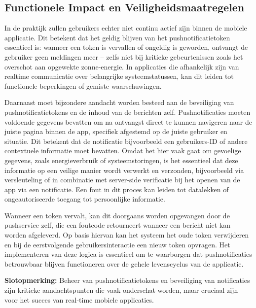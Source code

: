 \subsection{Functionele Impact en Veiligheidsmaatregelen}
In de praktijk zullen gebruikers echter niet continu actief zijn binnen de mobiele applicatie. Dit betekent dat het geldig blijven van het pushnotificatietoken essentieel is: wanneer een token is vervallen of ongeldig is geworden, ontvangt de gebruiker geen meldingen meer – zelfs niet bij kritieke gebeurtenissen zoals het overschot aan opgewekte zonne-energie. In applicaties die afhankelijk zijn van realtime communicatie over belangrijke systeemstatussen, kan dit leiden tot functionele beperkingen of gemiste waarschuwingen.

Daarnaast moet bijzondere aandacht worden besteed aan de beveiliging van pushnotificatietokens en de inhoud van de berichten zelf. Pushnotificaties moeten voldoende gegevens bevatten om na ontvangst direct te kunnen navigeren naar de juiste pagina binnen de app, specifiek afgestemd op de juiste gebruiker en situatie. Dit betekent dat de notificatie bijvoorbeeld een gebruikers-ID of andere contextuele informatie moet bevatten. Omdat het hier vaak gaat om gevoelige gegevens, zoals energieverbruik of systeemstoringen, is het essentieel dat deze informatie op een veilige manier wordt verwerkt en verzonden, bijvoorbeeld via versleuteling of in combinatie met server-side verificatie bij het openen van de app via een notificatie. Een fout in dit proces kan leiden tot datalekken of ongeautoriseerde toegang tot persoonlijke informatie.

Wanneer een token vervalt, kan dit doorgaans worden opgevangen door de pushservice zelf, die een foutcode retourneert wanneer een bericht niet kan worden afgeleverd. Op basis hiervan kan het systeem het oude token verwijderen en bij de eerstvolgende gebruikersinteractie een nieuw token opvragen. Het implementeren van deze logica is essentieel om te waarborgen dat pushnotificaties betrouwbaar blijven functioneren over de gehele levenscyclus van de applicatie.

\textbf{Slotopmerking:} Beheer van pushnotificatietokens en beveiliging van notificaties zijn kritieke aandachtspunten die vaak onderschat worden, maar cruciaal zijn voor het succes van real-time mobiele applicaties.

